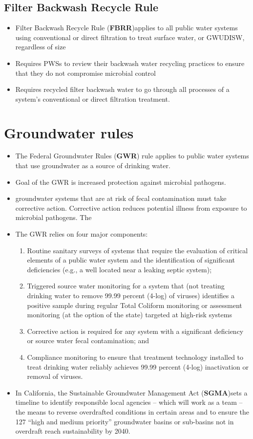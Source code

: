 \subsection{Filter Backwash Recycle Rule}
\begin{itemize}
\item Filter Backwash Recycle Rule (\textbf{FBRR})applies to all public water systems using conventional or direct filtration to treat surface water, or GWUDISW, regardless of size
\item Requires PWSs to review their backwash water recycling practices to ensure that they do not compromise microbial control
\item Requires recycled filter backwash water to go through all processes of a system’s conventional or direct filtration treatment. 
\end{itemize}

\section{Groundwater rules}
\begin{itemize}
\item The Federal Groundwater Rules (\textbf{GWR}) rule applies to public water systems that use groundwater as a source of drinking water.
\item Goal of the GWR is increased protection against microbial pathogens. 
\item groundwater systems that are at risk of fecal contamination must take corrective action. Corrective action reduces potential illness from exposure to microbial pathogens. The 
\item The GWR relies on four major components:
\begin{enumerate}
\item Routine sanitary surveys of systems that require the evaluation of critical elements of a public water system and the identification of significant deficiencies (e.g., a well located near a leaking septic system);
\item Triggered source water monitoring for a system that (not treating drinking water to remove 99.99 percent (4-log) of viruses) identifies a positive sample during regular Total Coliform monitoring or assessment monitoring (at the option of the state) targeted at high-risk systems
\item Corrective action is required for any system with a significant deficiency or source water fecal contamination; and
\item Compliance monitoring to ensure that treatment technology installed to treat drinking water reliably achieves 99.99 percent (4-log) inactivation or removal of viruses.
\end{enumerate}
\item In California, the Sustainable Groundwater Management Act (\textbf{SGMA})sets a timeline to identify responsible local agencies – which will work as a team – the means to reverse overdrafted conditions in certain areas and to ensure the 127 “high and medium priority” groundwater basins or sub-basins not in overdraft reach sustainability by 2040.
\end{itemize}

